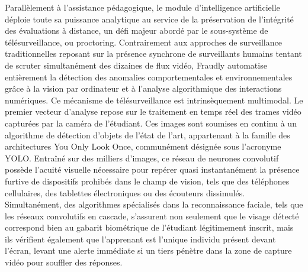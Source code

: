 Parallèlement à l'assistance pédagogique, le module d'intelligence artificielle déploie toute sa puissance analytique au service de la préservation de l'intégrité des évaluations à distance, un défi majeur abordé par le sous-système de télésurveillance, ou proctoring. Contrairement aux approches de surveillance traditionnelles reposant sur la présence synchrone de surveillants humains tentant de scruter simultanément des dizaines de flux vidéo, Fraudly automatise entièrement la détection des anomalies comportementales et environnementales grâce à la vision par ordinateur et à l'analyse algorithmique des interactions numériques. Ce mécanisme de télésurveillance est intrinsèquement multimodal. Le premier vecteur d'analyse repose sur le traitement en temps réel des trames vidéo capturées par la caméra de l'étudiant. Ces images sont soumises en continu à un algorithme de détection d'objets de l'état de l'art, appartenant à la famille des architectures You Only Look Once, communément désignée sous l'acronyme YOLO. Entraîné sur des milliers d'images, ce réseau de neurones convolutif possède l'acuité visuelle nécessaire pour repérer quasi instantanément la présence furtive de dispositifs prohibés dans le champ de vision, tels que des téléphones cellulaires, des tablettes électroniques ou des écouteurs dissimulés. Simultanément, des algorithmes spécialisés dans la reconnaissance faciale, tels que les réseaux convolutifs en cascade, s'assurent non seulement que le visage détecté correspond bien au gabarit biométrique de l'étudiant légitimement inscrit, mais ils vérifient également que l'apprenant est l'unique individu présent devant l'écran, levant une alerte immédiate si un tiers pénètre dans la zone de capture vidéo pour souffler des réponses.

